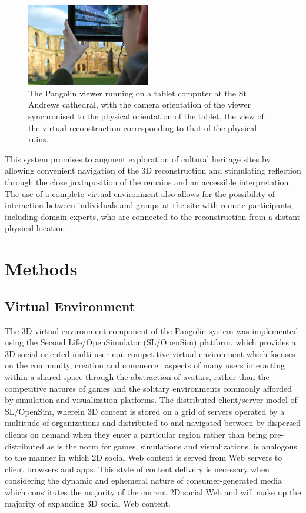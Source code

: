 \begin{figure}[h]
\centering
\includegraphics[width=0.48\textwidth]{images/figure_3}
\caption{The Pangolin viewer running on a tablet computer at the St Andrews cathedral, with the camera orientation of the viewer synchronised to the physical orientation of the tablet, the view of the virtual reconstruction corresponding to that of the physical ruins.}
\label{pangolin_in_action}
\end{figure}

This system promises to augment exploration of cultural heritage sites by allowing convenient navigation of the 3D reconstruction and stimulating reflection through the close juxtaposition of the remains and an accessible interpretation. The use of a complete virtual environment also allows for the possibility of interaction between individuals and groups at the site with remote participants, including domain experts, who are connected to the reconstruction from a distant physical location.

\section{Methods}
\subsection{Virtual Environment}
The 3D virtual environment component of the Pangolin system was implemented using the Second Life/OpenSimulator (SL/OpenSim) platform, which provides a 3D social-oriented multi-user non-competitive virtual environment which focuses on the community, creation and commerce~\cite{Sevan2008} aspects of many users interacting within a shared space through the abstraction of avatars, rather than the competitive natures of games and the solitary environments commonly afforded by simulation and visualization platforms. The distributed client/server model of SL/OpenSim, wherein 3D content is stored on a grid of servers operated by a multitude of organizations and distributed to and navigated between by dispersed clients on demand when they enter a particular region rather than being pre-distributed as is the norm for games, simulations and visualizations, is analogous to the manner in which 2D social Web content is served from Web servers to client browsers and apps. This style of content delivery is necessary when considering the dynamic and ephemeral nature of consumer-generated media which constitutes the majority of the current 2D social Web and will make up the majority of expanding 3D social Web content.

